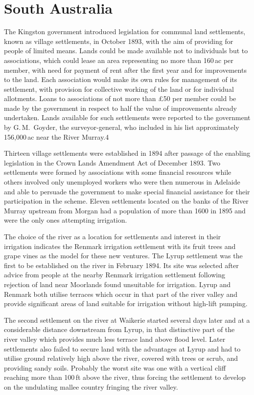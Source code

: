 \section{South Australia}

The Kingston government introduced legislation for communal land
settlements, known as village settlements, in October 1893, with the
aim of providing for people of limited means.  Lands could be made
available not to individuals but to associations, which could lease an
area representing no more than 160\,ac per member, with need for
payment of rent after the first year and for improvements to the land.
Each association would make its own rules for management of its
settlement, with provision for collective working of the land or for
individual allotments.  Loans to associations of not more than
\pounds50 per member could be made by the government in respect to
half the value of improvements already undertaken.  Lands available
for such settlements were reported to the government by G.\,M.~Goyder,
the surveyor-general, who included in his list approximately
156,000\,ac near the River Murray.4

Thirteen village settlements were established in 1894 after passage of
the enabling legislation in the Crown Lands Amendment Act of December
1893.  Two settlements were formed by associations with some financial
resources while others involved only unemployed workers who were then
numerous in Adelaide and able to persuade the government to make
special financial assistance for their participation in the scheme.
Eleven settlements located on the banks of the River Murray upstream
from Morgan had a population of more than 1600 in 1895 and were the
only ones attempting irrigation.

The choice of the river as a location for settlements and interest in
their irrigation indicates the Renmark irrigation settlement with its
fruit trees and grape vines as the model for these new ventures.  The
Lyrup settlement was the first to be established on the river in
February 1894.  Its site was selected after advice from people at the
nearby Renmark irrigation settlement following rejection of land near
Moorlands found unsuitable for irrigation.  Lyrup and Renmark both
utilise terraces which occur in that part of the river valley and
provide significant areas of land suitable for irrigation without
high-lift pumping.

The second settlement on the river at Waikerie started several days
later and at a considerable distance downstream from Lyrup, in that
distinctive part of the river valley which provides much less terrace
land above flood level.  Later settlements also failed to secure land
with the advantages at Lyrup and had to utilise ground relatively high
above the river, covered with trees or scrub, and providing sandy
soils.  Probably the worst site was one with a vertical cliff reaching
more than 100\,ft above the river, thus forcing the settlement to
develop on the undulating mallee country fringing the river valley.

